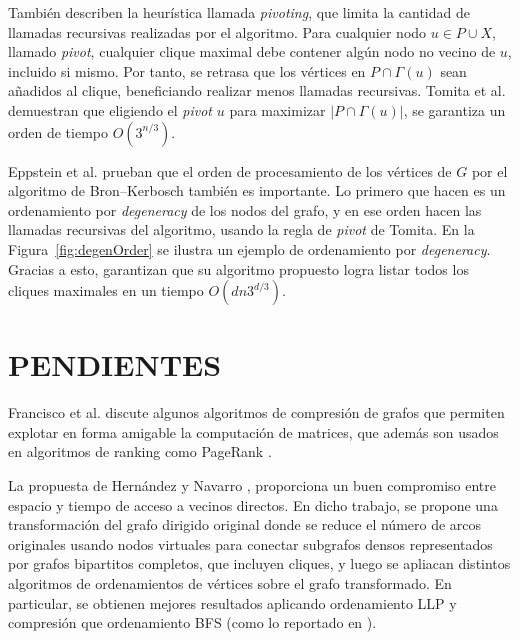 También describen la heurística llamada \textit{pivoting}, que limita la cantidad de llamadas recursivas realizadas por el algoritmo. Para cualquier nodo $u \in P \cup X$, llamado \textit{pivot}, cualquier clique maximal debe contener algún nodo no vecino de $u$, incluido si mismo. Por tanto, se retrasa que los vértices en $P \cap \Gamma(u)$ sean añadidos al clique, beneficiando realizar menos llamadas recursivas. Tomita et al. \cite{tomita2006worst} demuestran que eligiendo el \textit{pivot} $u$ para maximizar $|P \cap \Gamma(u)|$, se garantiza un orden de tiempo $O(3^{n/3})$.

Eppstein et al. \cite{eppstein2010listing} prueban que el orden de procesamiento de los vértices de $G$ por el algoritmo de Bron–Kerbosch también es importante. Lo primero que hacen es un ordenamiento por \textit{degeneracy} de los nodos del grafo, y en ese orden hacen las llamadas recursivas del algoritmo, usando la regla de \textit{pivot} de Tomita. En la Figura~\ref{fig:degenOrder} se ilustra un ejemplo de ordenamiento por \textit{degeneracy}. Gracias a esto, garantizan que su algoritmo propuesto logra listar todos los cliques maximales en un tiempo $O(dn3^{d/3})$.





\section{PENDIENTES}

 Francisco et al. \cite{francisco2018exploiting} discute algunos algoritmos de compresión de grafos que permiten explotar en forma amigable la computación de matrices, que además son usados en algoritmos de ranking como PageRank \cite{page1999pagerank}.

La propuesta de Hernández y Navarro \cite{tesisCecilia}, proporciona un buen compromiso entre espacio y tiempo de acceso a vecinos directos. En dicho trabajo, se propone una transformación del grafo dirigido original donde se reduce el número de arcos originales usando nodos virtuales para conectar subgrafos densos representados por grafos bipartitos completos, que incluyen cliques, y luego se apliacan distintos algoritmos de ordenamientos de vértices sobre el grafo transformado. En particular, se obtienen mejores resultados aplicando ordenamiento LLP y compresión \cite{boldi2011layered} que ordenamiento BFS (como lo reportado en \cite{Hernandez2014}).

